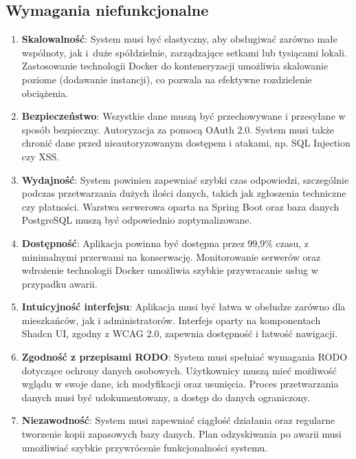 \subsection{Wymagania niefunkcjonalne}

\begin{enumerate}[label=\arabic*.,labelwidth=\widthof{10}]

   \item \textbf{Skalowalność}: System musi być elastyczny, aby obsługiwać zarówno małe wspólnoty, jak i~duże spółdzielnie, zarządzające setkami lub tysiącami lokali. Zastosowanie technologii Docker do konteneryzacji umożliwia skalowanie poziome (dodawanie instancji), co pozwala na efektywne rozdzielenie obciążenia.

	\item \textbf{Bezpieczeństwo}: Wszystkie dane muszą być przechowywane i przesyłane w sposób bezpieczny. Autoryzacja za pomocą OAuth 2.0. System musi także chronić dane przed nieautoryzowanym dostępem i atakami, np. SQL Injection czy XSS.

	\item \textbf{Wydajność}: System powinien zapewniać szybki czas odpowiedzi, szczególnie podczas przetwarzania dużych ilości danych, takich jak zgłoszenia techniczne czy płatności. Warstwa serwerowa oparta na Spring Boot oraz baza danych PostgreSQL muszą być odpowiednio zoptymalizowane.
	\item \textbf{Dostępność}: Aplikacja powinna być dostępna przez 99,9\% czasu, z minimalnymi przerwami na konserwację. Monitorowanie serwerów oraz wdrożenie technologii Docker umożliwia szybkie przywracanie usług w przypadku awarii.

	\item \textbf{Intuicyjność interfejsu}: Aplikacja musi być łatwa w obsłudze zarówno dla mieszkańców, jak i administratorów. Interfejs oparty na komponentach Shadcn UI, zgodny z WCAG 2.0, zapewnia dostępność i łatwość nawigacji.

	\item \textbf{Zgodność z przepisami RODO}: System musi spełniać wymagania RODO dotyczące ochrony danych osobowych. Użytkownicy muszą mieć możliwość wglądu w swoje dane, ich modyfikacji oraz usunięcia. Proces przetwarzania danych musi być udokumentowany, a dostęp do danych ograniczony.

	\item \textbf{Niezawodność}: System musi zapewniać ciągłość działania oraz regularne tworzenie kopii zapasowych bazy danych. Plan odzyskiwania po awarii musi umożliwiać szybkie przywrócenie funkcjonalności systemu.


\end{enumerate}
